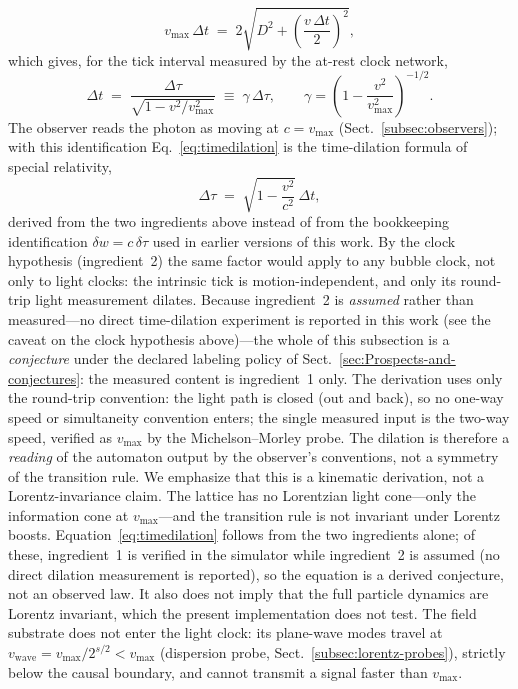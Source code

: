 \documentclass{ijuc}
\begin{document}
\begin{equation}
v_{\max}\,\Delta t \;=\; 2\sqrt{ D^{2} + \left(\frac{v\,\Delta t}{2}\right)^{2} } ,
\label{eq:lightclock}
\end{equation}
which gives, for the tick interval measured by the at-rest clock network,
\begin{equation}
\Delta t \;=\; \frac{\Delta\tau}{\sqrt{1-v^{2}/v_{\max}^{2}}} \;\equiv\; \gamma\,\Delta\tau , \qquad \gamma = \left(1-\frac{v^{2}}{v_{\max}^{2}}\right)^{-1/2}.
\label{eq:timedilation}
\end{equation}
The observer reads the photon as moving at $c=v_{\max}$ (Sect.~\ref{subsec:observers}); with this identification Eq.~\eqref{eq:timedilation} is the time-dilation formula of special relativity,
\begin{equation}
\Delta\tau \;=\; \sqrt{1-\frac{v^{2}}{c^{2}}}\,\Delta t ,
\label{eq:timedilation-sr}
\end{equation}
derived from the two ingredients above instead of from the bookkeeping identification $\delta w=c\,\delta\tau$ used in earlier versions of this work.  By the clock hypothesis (ingredient~2) the same factor would apply to any bubble clock, not only to light clocks: the intrinsic tick is motion-independent, and only its round-trip light measurement dilates.  Because ingredient~2 is \emph{assumed} rather than measured---no direct time-dilation experiment is reported in this work (see the caveat on the clock hypothesis above)---the whole of this subsection is a \emph{conjecture} under the declared labeling policy of Sect.~\ref{sec:Prospects-and-conjectures}: the measured content is ingredient~1 only.
The derivation uses only the round-trip convention: the light path is closed (out and back), so no one-way speed or simultaneity convention enters; the single measured input is the two-way speed, verified as $v_{\max}$ by the Michelson--Morley probe.  The dilation is therefore a \emph{reading} of the automaton output by the observer's conventions, not a symmetry of the transition rule.
We emphasize that this is a kinematic derivation, not a Lorentz-invariance claim.  The lattice has no Lorentzian light cone---only the information cone at $v_{\max}$---and the transition rule is not invariant under Lorentz boosts.  Equation~\eqref{eq:timedilation} follows from the two ingredients alone; of these, ingredient~1 is verified in the simulator while ingredient~2 is assumed (no direct dilation measurement is reported), so the equation is a derived conjecture, not an observed law.  It also does not imply that the full particle dynamics are Lorentz invariant, which the present implementation does not test.  The field substrate does not enter the light clock: its plane-wave modes travel at $v_{\mathrm{wave}}=v_{\max}/2^{s/2}<v_{\max}$ (dispersion probe, Sect.~\ref{subsec:lorentz-probes}), strictly below the causal boundary, and cannot transmit a signal faster than $v_{\max}$.
\end{document}
